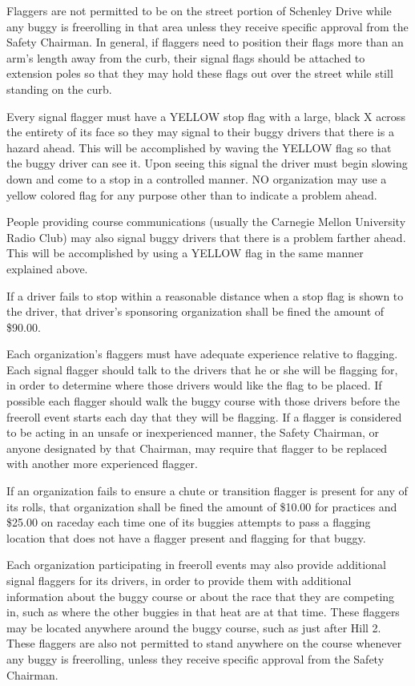 	Flaggers are not permitted to be on the street portion of Schenley Drive while any buggy is freerolling in that area unless they receive specific approval from the Safety Chairman. In general, if flaggers need to position their flags more than an arm's length away from the curb, their signal flags should be attached to extension poles so that they may hold these flags out over the street while still standing on the curb.

	Every signal flagger must have a YELLOW stop flag with a large, black X across the entirety of its face so they may signal to their buggy drivers that there is a hazard ahead. This will be accomplished by waving the YELLOW flag so that the buggy driver can see it. Upon seeing this signal the driver must begin slowing down and come to a stop in a controlled manner. NO organization may use a yellow colored flag for any purpose other than to indicate a problem ahead.

	People providing course communications (usually the Carnegie Mellon University Radio Club) may also signal buggy drivers that there is a problem farther ahead. This will be accomplished by using a YELLOW flag in the same manner explained above.

	If a driver fails to stop within a reasonable distance when a stop flag is shown to the driver, that driver's sponsoring organization shall be fined the amount of \$90.00.

	Each organization's flaggers must have adequate experience relative to flagging. Each signal flagger should talk to the drivers that he or she will be flagging for, in order to determine where those drivers would like the flag to be placed. If possible each flagger should walk the buggy course with those drivers before the freeroll event starts each day that they will be flagging. If a flagger is considered to be acting in an unsafe or inexperienced manner, the Safety Chairman, or anyone designated by that Chairman, may require that flagger to be replaced with another more experienced flagger.

	If an organization fails to ensure a chute or transition flagger is present for any of its rolls, that organization shall be fined the amount of \$10.00 for practices and \$25.00 on raceday each time one of its buggies attempts to pass a flagging location that does not have a flagger present and flagging for that buggy.

	Each organization participating in freeroll events may also provide additional signal flaggers for its drivers, in order to provide them with additional information about the buggy course or about the race that they are competing in, such as where the other buggies in that heat are at that time. These flaggers may be located anywhere around the buggy course, such as just after Hill 2. These flaggers are also not permitted to stand anywhere on the course whenever any buggy is freerolling, unless they receive specific approval from the Safety Chairman.
	
